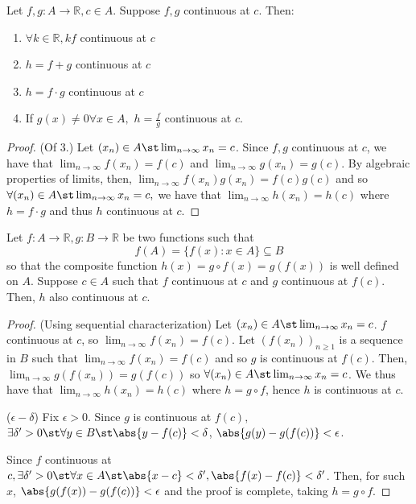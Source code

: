 \documentclass[12pt]{article}
\begin{document}
\begin{proposition}
  Let $f, g: A \to \mathbb{R}, c \in A$. Suppose $f,g$ continuous at $c$. Then:
  \begin{enumerate}
    \item $\forall k \in \mathbb{R}, kf$ continuous at $c$
    \item $h = f + g$ continuous at $c$
    \item $h = f \cdot g$ continuous at $c$
    \item If $g(x) \neq 0 \forall x \in A,$ $h = \frac{f}{g}$ continuous at $c$.
  \end{enumerate}
\end{proposition}
\begin{proof}(Of 3.)
  Let $(x_n) \in A \st \lim_{n\to\infty} x_n = c$. Since $f, g$ continuous at $c$, we have that $\lim_{n\to\infty}f(x_n) = f(c)$ and $\lim_{n\to\infty}g(x_n) = g(c)$. By algebraic properties of limits, then, $\lim_{n\to\infty} f(x_n)g(x_n) = f(c)g(c)$ and so $\forall (x_n) \in A \st \lim_{n\to\infty} x_n= c,$ we have that $\lim_{n\to\infty} h(x_n) = h(c)$ where $h = f \cdot g$ and thus $h$ continuous at $c$.
\end{proof}

\begin{theorem}
  Let $f: A \to \mathbb{R}, g : B \to \mathbb{R}$ be two functions such that \[
    f(A) = \{f(x) : x \in A\}   \subseteq B
  \]
  so that the composite function $h(x) = g \circ f (x) = g(f(x))$ is well defined on $A$. Suppose $c \in A$ such that $f$ continuous at $c$ and $g$ continuous at $f(c)$. Then, $h$ also continuous at $c$.
\end{theorem}

\begin{proof}(Using sequential characterization)
Let $(x_n) \in A \st \lim_{n\to\infty} x_n = c$. $f$ continuous at $c$, so $\lim_{n\to\infty} f(x_n) = f(c)$. Let $(f(x_n))_{n \geq 1}$ is a sequence in $B$ such that $\lim_{n\to\infty} f(x_n) = f(c)$ and so $g$ is continuous at $f(c)$. Then, $\lim_{n\to\infty} g(f(x_n)) = g(f(c))$ so $\forall (x_n) \in A \st \lim_{n\to\infty} x_n = c$. We thus have that $\lim_{n\to\infty} h(x_n) = h(c)$ where $h = g \circ f$, hence $h$ is continuous at $c$.

\noindent($\epsilon - \delta$) Fix $\epsilon > 0$. Since $g$ is continuous at $f(c),$ $\exists \delta' > 0 \st \forall y \in B \st \abs{y - f(c)} < \delta$, $\abs{g(y) - g(f(c))} < \epsilon$.

Since $f$ continuous at $c, \exists \delta'>0 \st \forall x \in A \st \abs{x - c} < \delta', \abs{f(x)-f(c)}< \delta'$. Then, for such $x$, $\abs{g(f(x)) - g(f(c))} < \epsilon$ and the proof is complete, taking $h = g \circ f$.
\end{proof}
\end{document}
